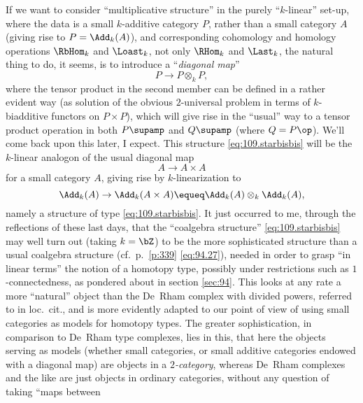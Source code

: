 \begin{remarks}
  \enspace If we want to consider
  ``multiplicative structure'' in the purely ``$k$-linear'' set-up,
  where the data is a small $k$-additive category $P$, rather than a
  small category $A$ (giving rise to $P=\Add_k(A)$), and corresponding
  cohomology and homology operations $\RbHom_k$ and $\Loast_k$, not
  only $\RHom_k$ and $\Last_k$, the natural thing to do, it seems, is
  to introduce a ``\emph{diagonal map}''
  \begin{equation}
    \label{eq:109.starbisbis}
    P \to P\otimes_k P,\tag{*}
  \end{equation}
  where the tensor product in the second member can be defined in a
  rather evident way (as solution of the obvious $2$-universal problem
  in terms of $k$-biadditive functors on $P\times P$), which will give
  rise in the ``usual'' way to a tensor product operation in both
  $P\supamp$ and $Q\supamp$ (where $Q=P\op$). We'll come
  back upon this later, I expect. This structure
  \eqref{eq:109.starbisbis} will be the $k$-linear analogon of the
  usual diagonal map
  \begin{equation}
    \label{eq:109.starstar}
    A\to A\times A\tag{**}
  \end{equation}
  for a small category $A$, giving rise by $k$-linearization to
  \[\Add_k(A)\to\Add_k(A\times A)\equeq \Add_k(A)\otimes_k\Add_k(A),\]
  namely a structure of type \eqref{eq:109.starbisbis}. It just
  occurred to me, through the reflections of these last days, that the
  ``coalgebra structure'' \eqref{eq:109.starbisbis} may well turn out
  (taking $k=\bZ$) to be the more sophisticated structure than a usual
  coalgebra structure (cf.\ p.\ \ref{p:339} \eqref{eq:94.27}), needed
  in order to grasp ``in linear terms'' the notion of a homotopy type,
  possibly under restrictions such as $1$-connectedness, as pondered
  about in section \ref{sec:94}. This looks at any rate a more
  ``natural'' object than the De~Rham complex with divided powers,
  referred to in loc.\ cit., and is more evidently adapted to our
  point of view of using small categories as models for homotopy
  types. The greater sophistication, in comparison to De~Rham type
  complexes, lies in this, that here the objects serving as models
  (whether small categories, or small additive categories endowed with
  a diagonal map) are objects in a \emph{$2$-category}, whereas
  De~Rham complexes and the like are just objects in ordinary
  categories, without any question of taking ``maps between

\end{remarks}
